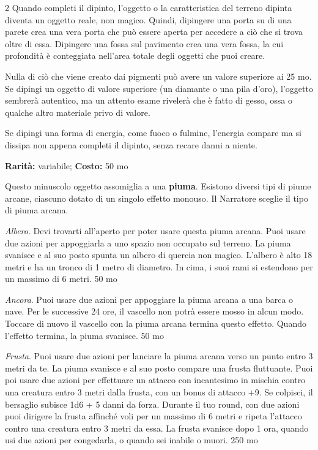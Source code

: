 \begin{multicols}{2}
Quando completi il dipinto, l'oggetto o la caratteristica del terreno dipinta diventa un oggetto reale, non magico. Quindi, dipingere una porta su di una parete crea una vera porta che può essere aperta per accedere a ciò che si trova oltre di essa. Dipingere una fossa sul pavimento crea una vera fossa, la cui profondità è conteggiata nell'area totale degli oggetti che puoi creare.

Nulla di ciò che viene creato dai pigmenti può avere un valore superiore ai 25 mo. Se dipingi un oggetto di valore superiore (un diamante o una pila d'oro), l'oggetto sembrerà autentico, ma un attento esame rivelerà che è fatto di gesso, ossa o qualche altro materiale privo di valore.

Se dipingi una forma di energia, come fuoco o fulmine, l'energia compare ma si dissipa non appena completi il dipinto, senza recare danni a niente.


\textbf{Rarità:} variabile; \textbf{Costo:} 50 mo

Questo minuscolo oggetto assomiglia a una \textbf{piuma}. Esistono diversi tipi di piume arcane, ciascuno dotato di un singolo effetto monouso. Il Narratore sceglie il tipo di piuma arcana.

\emph{Albero}. Devi trovarti all'aperto per poter usare questa piuma arcana. Puoi usare due azioni per appoggiarla a uno spazio non occupato sul terreno. La piuma svanisce e al suo posto spunta un albero di quercia non magico. L'albero è alto 18 metri e ha un tronco di 1 metro di diametro. In cima, i suoi rami si estendono per un massimo di 6 metri. 50 mo

\emph{Ancora}. Puoi usare due azioni per appoggiare la piuma arcana a una barca o nave. Per le successive 24 ore, il vascello non potrà essere mosso in alcun modo. Toccare di nuovo il vascello con la piuma arcana termina questo effetto. Quando l'effetto termina, la piuma svanisce. 50 mo

\emph{Frusta}. Puoi usare due azioni per lanciare la piuma arcana verso un punto entro 3 metri da te. La piuma svanisce e al suo posto compare una frusta fluttuante. Puoi poi usare due azioni per effettuare un attacco con incantesimo in mischia contro una creatura entro 3 metri dalla frusta, con un bonus di attacco +9. Se colpisci, il bersaglio subisce 1d6 + 5 danni da forza. Durante il tuo round, con due azioni puoi dirigere la frusta affinché voli per un massimo di 6 metri e ripeta l'attacco contro una creatura entro 3 metri da essa. La frusta svanisce dopo 1 ora, quando usi due azioni per congedarla, o quando sei inabile o muori. 250 mo


\end{multicols}

